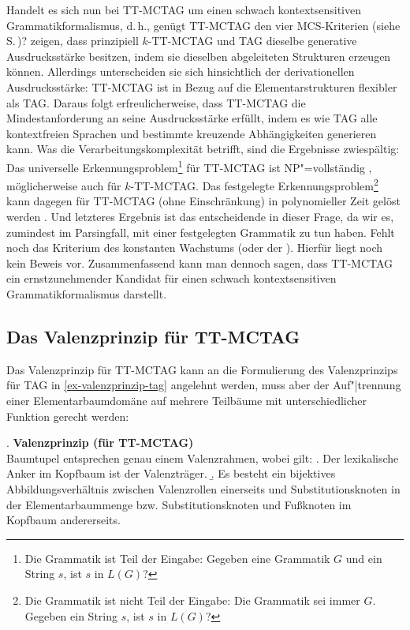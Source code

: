 Handelt es sich nun bei TT-MCTAG um einen schwach kontextsensitiven Grammatikformalismus, d.\,h., genügt TT-MCTAG den vier MCS-Kriterien (siehe S.\,\pageref{ex-kriterien-mcs})? \cite{Kallmeyer:Parmentier:08} zeigen, dass prinzipiell $k$-TT-MCTAG und TAG dieselbe generative Ausdrucksstärke besitzen, indem sie dieselben abgeleiteten Strukturen erzeugen können. Allerdings unterscheiden sie sich hinsichtlich der derivationellen Ausdrucksstärke: TT-MCTAG ist in Bezug auf die Elementarstrukturen flexibler als TAG. Daraus folgt erfreulicherweise, dass TT-MCTAG die Mindestanforderung an seine Ausdrucksstärke erfüllt, indem es wie TAG alle kontextfreien Sprachen und bestimmte kreuzende Abhängigkeiten generieren kann. Was die Verarbeitungskomplexität betrifft, sind die Ergebnisse zwiespältig: Das universelle Erkennungsproblem\footnote{Die Grammatik ist Teil der Eingabe: Gegeben eine Grammatik $G$ und ein String $s$, ist $s$ in $L(G)$?} für TT-MCTAG ist NP"=vollständig \citep{Sogaard:Lichte:Maier:07}, möglicherweise auch für $k$-TT-MCTAG. Das festgelegte Erkennungsproblem\footnote{Die Grammatik ist nicht Teil der  Eingabe: Die Grammatik sei immer $G$. Gegeben ein String $s$, ist $s$ in $L(G)$?} kann dagegen für TT-MCTAG (ohne Einschränkung) in polynomieller Zeit gelöst werden \citep{Kallmeyer:Satta:09}. Und letzteres Ergebnis ist das entscheidende in dieser Frage, da wir es, zumindest im Parsingfall, mit einer festgelegten Grammatik zu tun haben. Fehlt noch das Kriterium des konstanten Wachstums (oder der ). Hierfür liegt noch kein Beweis vor. Zusammenfassend kann man dennoch sagen, dass TT-MCTAG ein ernstzunehmender Kandidat für einen schwach kontextsensitiven Grammatikformalismus darstellt.


\subsection{Das Valenzprinzip für TT-MCTAG}

Das Valenzprinzip für TT-MCTAG kann an die Formulierung des Valenzprinzips für TAG in \ref{ex-valenzprinzip-tag} angelehnt werden, muss aber der Auf"|trennung einer Elementarbaumdomäne auf mehrere Teilbäume mit unterschiedlicher Funktion gerecht werden:

\ex. \label{ex-valenzprinzip-mctag}{\bf Valenzprinzip (für TT-MCTAG)} \\ 
Baumtupel entsprechen genau einem Valenzrahmen, wobei gilt:
\a. Der lexikalische Anker im Kopfbaum ist der Valenzträger.
\b. Es besteht ein bijektives Abbildungsverhältnis zwischen Valenzrollen einerseits und Substitutionsknoten in der Elementarbaummenge bzw. Substitutionsknoten und Fu\ss knoten im Kopfbaum andererseits.

